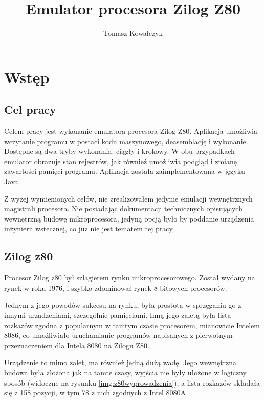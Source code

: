 \documentclass{article}
\author{Tomasz Kowalczyk}
\title{Emulator procesora Zilog Z80}
\begin{document}
	\maketitle
	\tableofcontents
	
	\section{Wstęp}
	\subsection{Cel pracy}
	Celem pracy jest wykonanie emulatora procesora Zilog Z80. Aplikacja umożliwia wczytanie programu w postaci kodu maszynowego, deasemblację i wykonanie. Dostępne są dwa tryby wykonania: ciągły i krokowy. W obu przypadkach emulator obrazuje stan rejestrów, jak również umożliwia podgląd i zmianę zawartości pamięci programu. Aplikacja została zaimplementowana w języku Java.
	
	Z wyżej wymienionych celów, nie zrealizowałem jedynie emulacji wewnętrznych magistrali procesora. Nie posiadając dokumentacji technicznych opisujących wewnętrzną budowę mikroprocesora, jedyną opcją było by poddanie urządzenia inżynierii wstecznej, \underline{co już nie jest tematem tej pracy.}
	
	\subsection{Zilog z80}
	Procesor Zilog z80 był szlagierem rynku mikroprocesorowego. \cite{karczmarczuk}
	Został wydany na rynek w roku 1976, i szybko zdominował rynek 8-bitowych procesorów.
	
	Jednym z jego powodów sukcesu na rynku, była prostota w sprzęganiu go z innymi urządzeniami, szczególnie pamięciami. Inną jego zaletą była lista rozkazów zgodna z popularnym w tamtym czasie procesorem, mianowicie Intelem 8086, co umożliwiało uruchamianie programów napisanych z pierwotnym przeznaczeniem dla Intela 8080 na Zilogu Z80. \cite{karczmarczuk}
	
	Urządzenie to mimo zalet, ma również jedną dużą wadę. Jego wewnętrzna budowa była złożona jak na tamte czasy, wyjścia nie były ułożone w logiczny sposób (widoczne na rysunku  \ref{img:z80wyprowadzenia}), a lista rozkazów składała się z 158 pozycji, w tym 78 z nich zgodnych z Intel 8080A \cite{manual}
	
\end{document}
